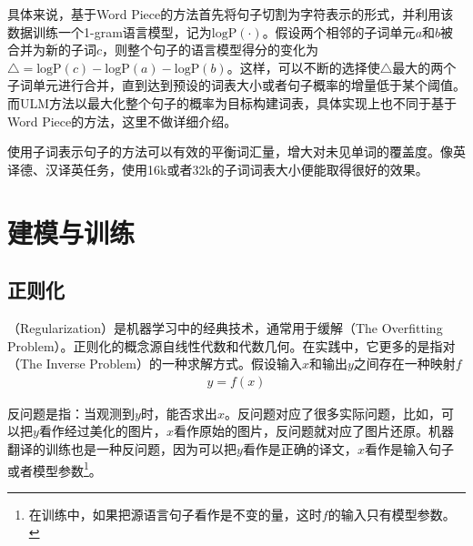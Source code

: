 \parinterval 具体来说，基于Word Piece的方法首先将句子切割为字符表示的形式\cite{6289079}，并利用该数据训练一个1-gram语言模型，记为$\textrm{logP}(\cdot)$。假设两个相邻的子词单元$a$和$b$被合并为新的子词$c$，则整个句子的语言模型得分的变化为$\triangle=\textrm{logP}(c)-\textrm{logP}(a)-\textrm{logP}(b)$。这样，可以不断的选择使$\triangle$最大的两个子词单元进行合并，直到达到预设的词表大小或者句子概率的增量低于某个阈值。而ULM方法以最大化整个句子的概率为目标构建词表\cite{DBLP:conf/acl/Kudo18}，具体实现上也不同于基于Word Piece的方法，这里不做详细介绍。

\parinterval 使用子词表示句子的方法可以有效的平衡词汇量，增大对未见单词的覆盖度。像英译德、汉译英任务，使用16k或者32k的子词词表大小便能取得很好的效果。


\sectionnewpage
\section{建模与训练}


\subsection{正则化}
\label{subsection-7.3.1}

（Regularization）是机器学习中的经典技术，通常用于缓解{\small{}}（The Overfitting Problem）。正则化的概念源自线性代数和代数几何。在实践中，它更多的是指对{\small{}}（The Inverse Problem）的一种求解方式。假设输入$x$和输出$y$之间存在一种映射$f$
\begin{eqnarray}
y = f(x)
\label{eq:7-1}
\end{eqnarray}

\noindent 反问题是指：当观测到$y$时，能否求出$x$。反问题对应了很多实际问题，比如，可以把$y$看作经过美化的图片，$x$看作原始的图片，反问题就对应了图片还原。机器翻译的训练也是一种反问题，因为可以把$y$看作是正确的译文，$x$看作是输入句子或者模型参数\footnote{在训练中，如果把源语言句子看作是不变的量，这时$f$的输入只有模型参数。}。


